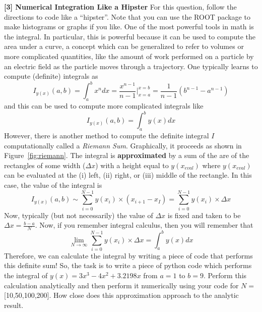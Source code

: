 \documentclass[12pt]{article}
\begin{document}
\newpage
\textbf{[3] Numerical Integration Like a Hipster} 
\newline
For this question, follow the directions to code like a ``hipster''.  Note that you can use the ROOT package to make histograms or graphs if you like.
\newline
\newline
One of the most powerful tools in math is the integral.  In particular, this is powerful because it can be used to compute the area under a curve, a concept which can be generalized to refer to volumes or more complicated quantities, like the amount of work performed on a particle by an electric field as the particle moves through a trajectory.  One typically learns to compute (definite) integrals as
\begin{displaymath}
I_{y(x)}(a,b)=\displaystyle\int_{a}^{b} x^n dx = \frac{x^{n-1}}{n-1}|_{x=a}^{x=b} =  \frac{1}{n-1}(b^{n-1}-a^{n-1})
\end{displaymath}
and this can be used to compute more complicated integrals like
\begin{displaymath}
I_{y(x)}(a,b)=\displaystyle\int_{a}^{b} y(x) dx 
\end{displaymath}
However, there is another method to compute the definite integral $I$ computationally called a \textit{Riemann Sum}.  Graphically, it proceeds as shown in Figure~\ref{fig:riemann}.  The integral is \textbf{approximated} by a sum of the are of the rectangles of some width ($\Delta x$) with a height equal to $y(x_{eval})$ where $y(x_{eval})$ can be evaluated at the (i) left, (ii) right, or (iii) middle of the rectangle.  In this case, the value of the integral is
\begin{displaymath}
I_{y(x)}(a,b)\sim \displaystyle\sum_{i=0}^{N-1} y(x_{i})\times(x_{i+1}-x_{I})=\displaystyle\sum_{i=0}^{N-1} y(x_{i})\times\Delta x
\end{displaymath}
Now, typically (but not necessarily) the value of $\Delta x$ is fixed and taken to be $\Delta x=\frac{b-a}{N}$.  Now, if you remember integral calculus, then you will remember that
\begin{displaymath}
 \displaystyle\lim_{N\to\infty} \displaystyle\sum_{i=0}^{N-1} y(x_{i})\times\Delta x = \displaystyle\int_{a}^{b} y(x) dx 
\end{displaymath}
Therefore, we can calculate the integral by writing a piece of code that performs this definite sum!  So, the task is to write a piece of python code which performs the integral of $y(x)=3x^3-4x^2+3.2198x$ from $a=1$ to $b=9$.  Perform this calculation analytically and then perform it numerically using your code for $N=$[10,50,100,200].  How close does this approximation approach to the analytic result.
\end{document}
